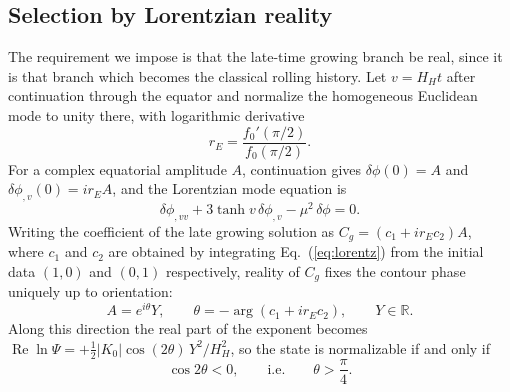 \documentclass[aps,prd,twocolumn,superscriptaddress,nofootinbib,longbibliography]{revtex4-2}
\begin{document}
\subsection{Selection by Lorentzian reality}
The requirement we impose is that the late-time growing branch be real, since
it is that branch which becomes the classical rolling history. Let $v=H_Ht$
after continuation through the equator and normalize the homogeneous
Euclidean mode to unity there, with logarithmic derivative
\begin{equation}
r_E=\frac{f_0'(\pi/2)}{f_0(\pi/2)} .
\end{equation}
For a complex equatorial amplitude $A$, continuation gives
$\delta\phi(0)=A$ and $\delta\phi_{,v}(0)=ir_EA$, and the Lorentzian mode
equation is
\begin{equation}
\delta\phi_{,vv}+3\tanh v\,\delta\phi_{,v}-\mu^2\,\delta\phi=0 .
\label{eq:lorentz}
\end{equation}
Writing the coefficient of the late growing solution as
$C_g=(c_1+ir_Ec_2)A$, where $c_1$ and $c_2$ are obtained by integrating
Eq.~(\ref{eq:lorentz}) from the initial data $(1,0)$ and $(0,1)$
respectively, reality of $C_g$ fixes the contour phase uniquely up to
orientation:
\begin{equation}
A=e^{i\theta}Y,\qquad
\theta=-\arg\!\left(c_1+ir_Ec_2\right),\qquad Y\in\mathbb{R}.
\label{eq:theta}
\end{equation}
Along this direction the real part of the exponent becomes
$\operatorname{Re}\ln\Psi=+\tfrac12|K_0|\cos(2\theta)\,Y^2/H_H^2$, so the
state is normalizable if and only if
\begin{equation}
\cos2\theta<0,
\qquad\text{i.e.}\qquad \theta>\frac{\pi}{4}.
\label{eq:normcond}
\end{equation}
\end{document}
